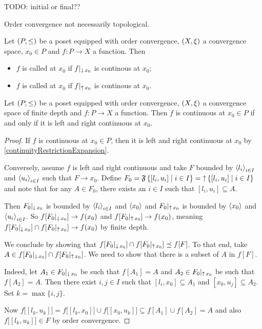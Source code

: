 TODO: initial or final??

\begin{example}
Order convergence not necessarily topological.
\end{example}


\begin{definition}
Let $\left( P,\leq \right)$ be a poset equipped with order convergence, $\left( X,\xi \right)$ a convergence space, $x_0\in P$ and $f: P\to X$ a function. Then
\begin{itemize}
\item $f$ is called  at $x_0$ if $f|_{\operatorname{\downarrow} x_0}$ is continous at $x_0$;
\item $f$ is called  at $x_0$ if $f|_{\operatorname{\uparrow} x_0}$ is continous at $x_0$.
\end{itemize}
\end{definition}

\begin{proposition} \label{leftRightConvergence}
Let $\left( P,\leq \right)$ be a poset equipped with order convergence, $\left( X,\xi \right)$ a convergence space of finite depth and $f: P\to X$ a function. Then $f$ is continuous at $x_0\in P$ \textup{if and only if} it is left and right continuous at $x_0$.
\end{proposition}
\begin{proof}
If $f$ is continuous at $x_0\in P$, then it is left and right continuous at $x_0$ by \ref{continuityRestrictionExpansion}.

Conversely, assume $f$ is left and right continuous and take $F$ bounded by $\left\langle l_i \right\rangle_{i\in I}$ and $\left\langle u_i \right\rangle_{i\in I}$ such that $F\to x_0$. Define $F_0 = \mathfrak{F}\left\{ [l_i, u_i] \;\middle|\; i\in I \right\} = \operatorname{\uparrow} \left\{ [l_i, u_i] \;\middle|\; i\in I \right\}$ and note that for any $A\in F_0$, there exists an $i\in I$ such that $[l_i,u_i]\subseteq A$.


Then $F_0|_{\operatorname{\downarrow} x_0}$ is bounded by $\left\langle l_i \right\rangle_{i\in I}$ and $\left\langle x_0 \right\rangle$ and $F_0|_{\operatorname{\uparrow} x_0}$ is bounded by $\left\langle x_0 \right\rangle$ and $\left\langle u_i \right\rangle_{i\in I}$. So $f[F_0|_{\operatorname{\downarrow} x_0}] \to f(x_0)$ and $f[F_0|_{\operatorname{\uparrow} x_0}] \to f(x_0)$, meaning $f[F_0|_{\operatorname{\downarrow} x_0}]\cap f[F_0|_{\operatorname{\uparrow} x_0}] \to f(x_0)$ by finite depth.

We conclude by showing that $f[F_0|_{\operatorname{\downarrow} x_0}]\cap f[F_0|_{\operatorname{\uparrow} x_0}] \preceq f[F]$. To that end, take $A\in f[F_0|_{\operatorname{\downarrow} x_0}]\cap f[F_0|_{\operatorname{\uparrow} x_0}]$. We need to show that there is a subset of $A$ in $f[F]$.

Indeed, let $A_1\in F_0|_{\operatorname{\downarrow} x_0}$ be such that $f[A_1] = A$ and $A_2\in F_0|_{\operatorname{\uparrow} x_0}$ be such that $f[A_2] = A$.
Then there exist $i,j\in I$ such that $[l_i,x_0]\subseteq A_1$ and $[x_0, u_j]\subseteq A_2$. Set $k = \max\{i,j\}$.

Now $f\Big[[l_k,u_k]\Big] = f\Big[[l_k,x_0]\Big] \cup f\Big[[x_0,u_k]\Big]\subseteq f[A_1]\cup f[A_2] = A$ and also $f\Big[[l_k,u_k]\Big]\in F$ by order convergence.
\end{proof}

